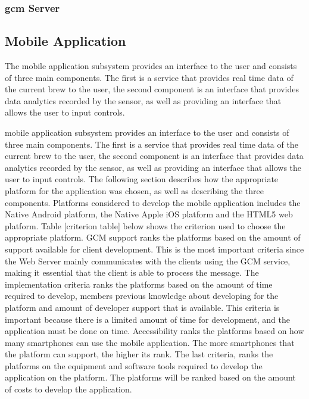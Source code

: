 \documentclass{article}
\begin{document}
\subsubsection{\gls{gcm} Server}




\subsection{Mobile Application}\label{subsec:mobile-app}
The mobile application subsystem provides an interface to the user and consists of three main components. The first is a service that provides real time data of the current brew to the user, the second component is an interface that provides data analytics recorded by the sensor, as well as providing an interface that allows the user to input controls.


 mobile application subsystem provides an interface to the user and consists of three main components. The first is a service that provides real time data of the current brew to the user, the second component is an interface that provides data analytics recorded by the sensor, as well as providing an interface that allows the user to input controls. The following section describes how the appropriate platform for the application was chosen, as well as describing the three components.
Platforms considered to develop the mobile application includes the Native Android platform, the Native Apple iOS platform and the HTML5 web platform. Table [criterion table] below shows the criterion used to choose the appropriate platform. GCM support ranks the platforms based on the amount of support available for client development. This is the most important criteria since the Web Server mainly communicates with the clients using the GCM service, making it essential that the client is able to process the message. The implementation criteria ranks the platforms based on the amount of time required to develop, members previous knowledge about developing for the platform and amount of developer support that is available. This criteria is important because there is a limited amount of time for development, and the application must be done on time. Accessibility ranks the platforms based on how many smartphones can use the mobile application. The more smartphones that the platform can support, the higher its rank. The last criteria, ranks the platforms on the equipment and software tools required to develop the application on the platform. The platforms will be ranked based on the amount of costs to develop the application.
\end{document}
